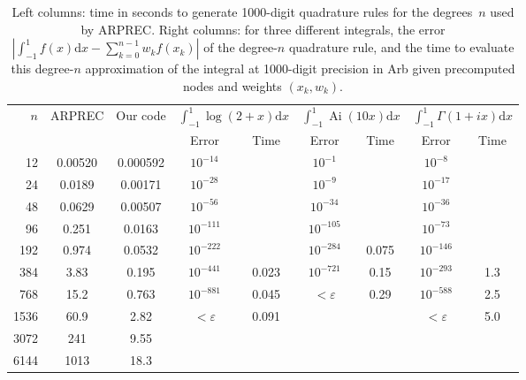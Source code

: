 \documentclass[nohypdvips,review]{siamart0216}
\newcommand{\dx}{\mathrm d x}
\begin{document}
\begin{table}[h!]
\caption{Left columns: time in seconds to generate 1000-digit
quadrature rules for the degrees~$n$ used by ARPREC.
Right columns: for three different integrals, the
error $|\int_{-1}^1 f(x) \dx - \sum_{k=0}^{n-1} w_k f(x_k)|$ of the degree-$n$
quadrature rule, and the time to evaluate this degree-$n$ approximation
of the integral at 1000-digit precision in Arb given precomputed nodes and weights $(x_k, w_k)$.}
\begin{center}
\begin{tabular}{ r | c c | c c| c c | c c }
$n$ & ARPREC & Our code &
    \multicolumn{2}{|c|}{$\int_{-1}^{1}\!\log(2\!+\!x) \dx$} &
    \multicolumn{2}{|c|}{$\int_{-1}^{1}\!\operatorname{Ai}(10 x) \dx$} &
    \multicolumn{2}{|c}{$\int_{-1}^{1}\!\Gamma(1\!+\!ix) \dx$} \\
   &         &          & Error   & Time      &  Error & Time  &  Error & Time \\ \hline
\rule{0pt}{3ex}12 & 0.00520 & 0.000592 & $10^{-14}$ &       &   $10^{-1}$ &  &  $10^{-8}$ & \\
24 & 0.0189 & 0.00171 & $10^{-28}$  &       &  $10^{-9}$  & &  $10^{-17}$ & \\
48 & 0.0629 & 0.00507 & $10^{-56}$ &        &  $10^{-34}$  &    &  $10^{-36}$ & \\
96 & 0.251 & 0.0163 & $10^{-111}$  &         &  $10^{-105}$ &          &  $10^{-73}$ & \\
192 & 0.974 & 0.0532 & $10^{-222}$ &         &  $10^{-284}$ &    0.075      &   $10^{-146}$ & \\
384 & 3.83 & 0.195 & $10^{-441}$  &  0.023        & $10^{-721}$ & 0.15           &   $10^{-293}$ & 1.3 \\
768 & 15.2 & 0.763 & $10^{-881}$ & 0.045      & $<\varepsilon$ & 0.29           &   $10^{-588}$ & 2.5 \\
1536 & 60.9 & 2.82 & $<\varepsilon$ &  0.091     &                &    &            $<\varepsilon$ & 5.0 \\
3072 & 241 & 9.55 &  &  &  &  &  &  \\
6144 & 1013 & 18.3 &  &  &  &  &  &  \\
\end{tabular}
\label{tab:arprectimings}
\end{center}
\end{table}
\end{document}
